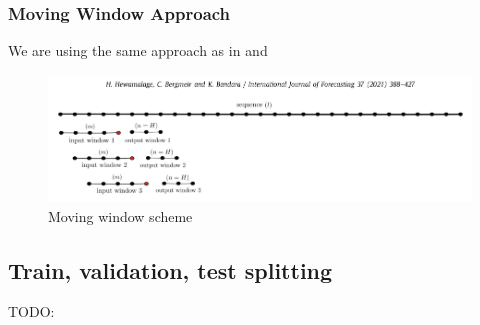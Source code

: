 \subsubsection{Moving Window Approach}
We are using the same approach  as in \cite{Bandara2019} %
and \cite{Hewamalage2021}%
\begin{figure}[h!]
  \centering
  \includegraphics[width=\textwidth]{./figs/illustrations/moving_window_illustration.png}
  \hfill
  \caption{Moving window scheme \citep{Hewamalage2021}}
  \label{fig:dataset:moving_window_scheme}
\end{figure}

\subsection{Train, validation, test splitting}
TODO: